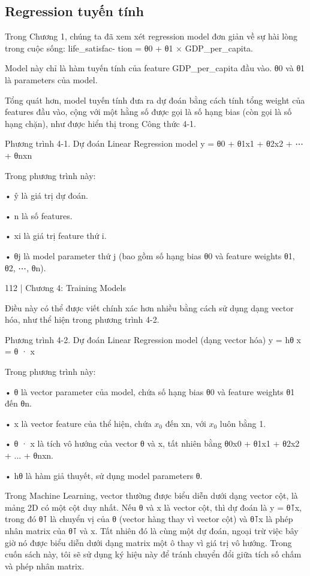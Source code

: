 \subsection{Regression tuyến tính}

Trong Chương 1, chúng ta đã xem xét regression model đơn giản về sự hài lòng trong cuộc sống: life\_satisfac- tion = θ0 + θ1 × GDP\_per\_capita.

Model này chỉ là hàm tuyến tính của feature GDP\_per\_capita đầu vào. θ0 và θ1 là parameters của model.

Tổng quát hơn, model tuyến tính đưa ra dự đoán bằng cách tính tổng weight của features đầu vào, cộng với một hằng số được gọi là số hạng bias (còn gọi là số hạng chặn), như được hiển thị trong Công thức 4-1.

Phương trình 4-1. Dự đoán Linear Regression model y = θ0 + θ1x1 + θ2x2 + ⋯+ θnxn

Trong phương trình này:

• ŷ là giá trị dự đoán.

• n là số features.

• xi là giá trị feature thứ i.

• θj là model parameter thứ j (bao gồm số hạng bias θ0 và feature weights θ1, θ2, ⋯, θn).

112 | Chương 4: Training Models

Điều này có thể được viết chính xác hơn nhiều bằng cách sử dụng dạng vector hóa, như thể hiện trong phương trình 4-2.

Phương trình 4-2. Dự đoán Linear Regression model (dạng vector hóa) y = hθ x = θ · x

Trong phương trình này:

• θ là vector parameter của model, chứa số hạng bias θ0 và feature weights θ1 đến θn.

• x là vector feature của thể hiện, chứa $x_{0}$ đến xn, với $x_{0}$ luôn bằng 1.

• θ · x là tích vô hướng của vector θ và x, tất nhiên bằng θ0x0 + θ1x1 + θ2x2 + ... + θnxn.

• hθ là hàm giả thuyết, sử dụng model parameters θ.

Trong Machine Learning, vector thường được biểu diễn dưới dạng vector cột, là mảng 2D có một cột duy nhất. Nếu θ và x là vector cột, thì dự đoán là y = θ⊺x, trong đó θ⊺ là chuyển vị của θ (vector hàng thay vì vector cột) và θ⊺x là phép nhân matrix của θ⊺ và x. Tất nhiên đó là cùng một dự đoán, ngoại trừ việc bây giờ nó được biểu diễn dưới dạng matrix một ô thay vì giá trị vô hướng. Trong cuốn sách này, tôi sẽ sử dụng ký hiệu này để tránh chuyển đổi giữa tích số chấm và phép nhân matrix.

